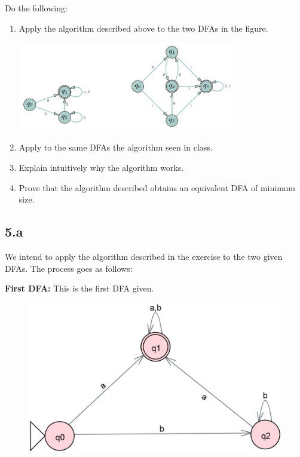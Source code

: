 \documentclass[12pt]{article}
\begin{document}
Do the following:
\begin{enumerate}
[label=\alph*)]
    \item Apply the algorithm described above to the two DFAs in the figure.
        \begin{minipage}{\textwidth}
            \centering
            \includegraphics[width=0.75\textwidth]{Tarea 3 Enunciado 5.png}
            \label{Enunciado Ej. 5}
        \end{minipage}
    \item Apply to the same DFAs the algorithm seen in class.
    \item Explain intuitively why the algorithm works.
    \item Prove that the algorithm described obtains an equivalent DFA of minimum size.
\end{enumerate}

\clearpage

\subsection*{5.a}

We intend to apply the algorithm described in the exercise to the two given DFAs. The process goes as follows:

\textbf{First DFA:} This is the first DFA given.

\begin{figure}[h]
    \centering
    \includegraphics[width=0.7\linewidth]{First_Automaton.png}
\end{figure}
\end{document}
